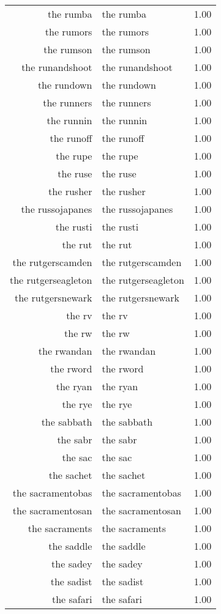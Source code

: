 \begin{table}[ht]
\begin{tabular}{rlr}
  the rumba & the rumba & 1.00 \\ 
  the rumors & the rumors & 1.00 \\ 
  the rumson & the rumson & 1.00 \\ 
  the runandshoot & the runandshoot & 1.00 \\ 
  the rundown & the rundown & 1.00 \\ 
  the runners & the runners & 1.00 \\ 
  the runnin & the runnin & 1.00 \\ 
  the runoff & the runoff & 1.00 \\ 
  the rupe & the rupe & 1.00 \\ 
  the ruse & the ruse & 1.00 \\ 
  the rusher & the rusher & 1.00 \\ 
  the russojapanes & the russojapanes & 1.00 \\ 
  the rusti & the rusti & 1.00 \\ 
  the rut & the rut & 1.00 \\ 
  the rutgerscamden & the rutgerscamden & 1.00 \\ 
  the rutgerseagleton & the rutgerseagleton & 1.00 \\ 
  the rutgersnewark & the rutgersnewark & 1.00 \\ 
  the rv & the rv & 1.00 \\ 
  the rw & the rw & 1.00 \\ 
  the rwandan & the rwandan & 1.00 \\ 
  the rword & the rword & 1.00 \\ 
  the ryan & the ryan & 1.00 \\ 
  the rye & the rye & 1.00 \\ 
  the sabbath & the sabbath & 1.00 \\ 
  the sabr & the sabr & 1.00 \\ 
  the sac & the sac & 1.00 \\ 
  the sachet & the sachet & 1.00 \\ 
  the sacramentobas & the sacramentobas & 1.00 \\ 
  the sacramentosan & the sacramentosan & 1.00 \\ 
  the sacraments & the sacraments & 1.00 \\ 
  the saddle & the saddle & 1.00 \\ 
  the sadey & the sadey & 1.00 \\ 
  the sadist & the sadist & 1.00 \\ 
  the safari & the safari & 1.00 \\ 

\end{tabular}
\end{table}
